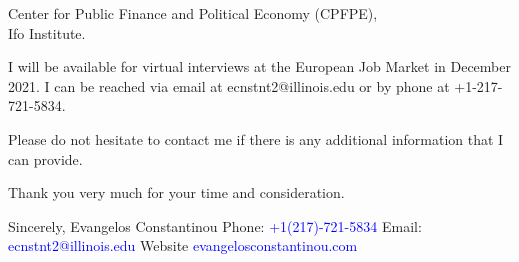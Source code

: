 \documentclass[12pt]{letter}
\begin{document}
\begin{letter}{Center for Public Finance and Political Economy (CPFPE),\\
Ifo Institute.}

I will be available for virtual interviews at the European Job Market in December 2021.
I can be reached via email at ecnstnt2@illinois.edu or by phone at +1-217-721-5834.

Please do not hesitate to contact me if there is any additional information that I can provide.

Thank you very much for your time and consideration.


\noindent Sincerely,
\newline\noindent Evangelos Constantinou
\vspace{4mm}
\newline\noindent Phone: \textcolor{blue}{+1(217)-721-5834}
\newline\noindent Email: \textcolor{blue}{ecnstnt2@illinois.edu}
\newline\noindent Website \textcolor{blue}{evangelosconstantinou.com}
\end{letter}
\end{document}
